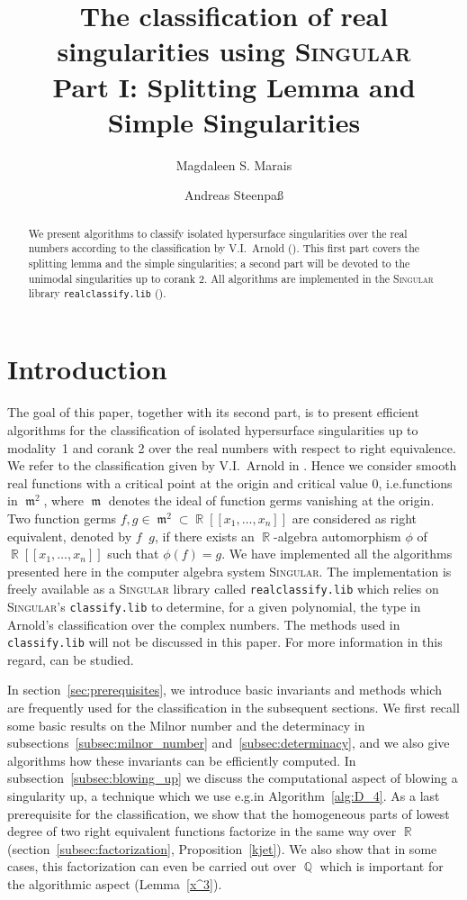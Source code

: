 \documentclass[noend]{amsproc}
\title[The classification of real singularities using \textsc{Singular}, %
Part I]%
{The classification of real singularities using \textsc{Singular}\\
Part I: Splitting Lemma and Simple Singularities}
\author{Magdaleen S. Marais}
\author{Andreas Steenpa\ss}
\newcommand{\Singular}{\textsc{Singular}}
\newcommand{\realclassify}{\texttt{realclassify.lib}}
\newcommand{\classify}{\texttt{classify.lib}}
\DeclareMathOperator{\requiv}{\overset{r}{\sim}}
\DeclareMathOperator{\m}{\mathfrak{m}}
\DeclareMathOperator{\Q}{\mathbb{Q}}
\DeclareMathOperator{\R}{\mathbb{R}}
\begin{document}
\begin{abstract}
We present algorithms to classify isolated hypersurface singularities over the
real numbers according to the classification by V.I.~Arnold (\cite{AVG1985}).
This first part covers the splitting lemma and the simple singularities; a
second part will be devoted to the unimodal singularities up to corank 2.
All algorithms are implemented in the \Singular{} library \realclassify{}
(\cite{realclassify}).
\end{abstract}

\maketitle


\section{Introduction}
The goal of this paper, together with its second part, is to present efficient
algorithms for the classification of isolated hypersurface singularities up to
modality~1 and corank 2 over the real numbers with respect to right
equivalence. We refer to the classification given by V.I.~Arnold in
\cite{AVG1985}. Hence we consider smooth real functions with a critical point
at the origin and critical value $0$, i.e.\@ functions in $\m^2$, where $\m$
denotes the ideal of function germs vanishing at the origin. Two function germs
$f, g \in \m^2 \subset \R[[x_1,\ldots,x_n]]$ are considered as right
equivalent, denoted by $f \requiv g$, if there exists an $\R$-algebra
automorphism $\phi$ of $\R[[x_1,\ldots, x_n]]$ such that $\phi(f) = g$.  We
have implemented all the algorithms presented here in the computer algebra
system \Singular.  The implementation is freely available as a \Singular{}
library called \realclassify{} which relies on \Singular's \classify{} to
determine, for a given polynomial, the type in Arnold's classification over the
complex numbers. The methods used in \classify{} will not be discussed in this
paper. For more information in this regard, \cite{Kruger} can be studied.

In section~\ref{sec:prerequisites}, we introduce basic invariants and methods
which are frequently used for the classification in the subsequent sections. We
first recall some basic results on the Milnor number and the determinacy in
subsections~\ref{subsec:milnor_number} and~\ref{subsec:determinacy}, and we
also give algorithms how these invariants can be efficiently computed. In
subsection~\ref{subsec:blowing_up} we discuss the computational aspect of
blowing a singularity up, a technique which we use e.g.\@ in
Algorithm~\ref{alg:D_4}. As a last prerequisite for the classification, we
show that the homogeneous parts of lowest degree of two right equivalent
functions factorize in the same way over $\R$
(section~\ref{subsec:factorization}, Proposition~\ref{kjet}). We also show that
in some cases, this factorization can even be carried out over $\Q$ which is
important for the algorithmic aspect (Lemma~\ref{x^3}).
\end{document}
